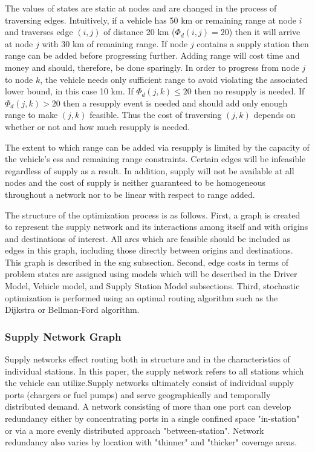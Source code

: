 The values of states are static at nodes and are changed in the process of traversing edges. Intuitively, if a vehicle has 50 km or remaining range at node $i$ and traverses edge $(i, j)$ of distance 20 km ($\Phi_d(i,j) = 20$) then it will arrive at node $j$ with 30 km of remaining range. If node $j$ contains a supply station then range can be added before progressing further. Adding range will cost time and money and should, therefore, be done sparingly. In order to progress from node $j$ to node $k$, the vehicle needs only sufficient range to avoid violating the associated lower bound, in this case 10 km. If $\Phi_d(j,k) \leq 20$ then no resupply is needed. If $\Phi_d(j,k) > 20$ then a resupply event is needed and should add only enough range to make $(j,k)$ feasible. Thus the cost of traversing $(j,k)$ depends on whether or not and how much resupply is needed. 

The extent to which range can be added via resupply is limited by the capacity of the vehicle's \gls{ess} and remaining range constraints. Certain edges will be infeasible regardless of supply as a result. In addition, supply will not be available at all nodes and the cost of supply is neither guaranteed to be homogeneous throughout a network nor to be linear with respect to range added.

The structure of the optimization process is as follows. First, a graph is created to represent the supply network and its interactions among itself and with origins and destinations of interest. All arcs which are feasible should be included as edges in this graph, including those directly between origins and destinations. This graph is described in the \gls{sng} subsection. Second, edge costs in terms of problem states are assigned using models which will be described in the Driver Model, Vehicle model, and Supply Station Model subsections. Third, stochastic optimization is performed using an optimal routing algorithm such as the Dijkstra or Bellman-Ford algorithm.

\subsubsection*{Supply Network Graph}

Supply networks effect routing both in structure and in the characteristics of individual stations. In this paper, the supply network refers to all stations which the vehicle can utilize.Supply networks ultimately consist of individual supply ports (chargers or fuel pumps) and serve geographically and temporally distributed demand. A network consisting of more than one port can develop redundancy either by concentrating ports in a single confined space "in-station" or via a more evenly distributed approach "between-station". Network redundancy also varies by location with "thinner" and "thicker" coverage areas.

